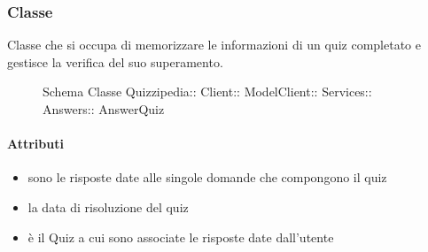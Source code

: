 \subsubsection{Classe }
Classe che si occupa di memorizzare le informazioni di un quiz completato e gestisce la verifica del suo superamento.
\begin{figure}[H]
\centering
\noindent{}
\caption[Schema Classe AnswerQuiz]{Schema Classe Quizzipedia:: Client:: ModelClient:: Services:: Answers:: AnswerQuiz}
\end{figure}
\paragraph{Attributi}
\begin{itemize}
\item {}
\newline
sono le risposte date alle singole domande che compongono il quiz
\item {}
\newline
la data di risoluzione del quiz
\item {}
\newline
è il Quiz a cui sono associate le risposte date dall'utente
\end{itemize}
